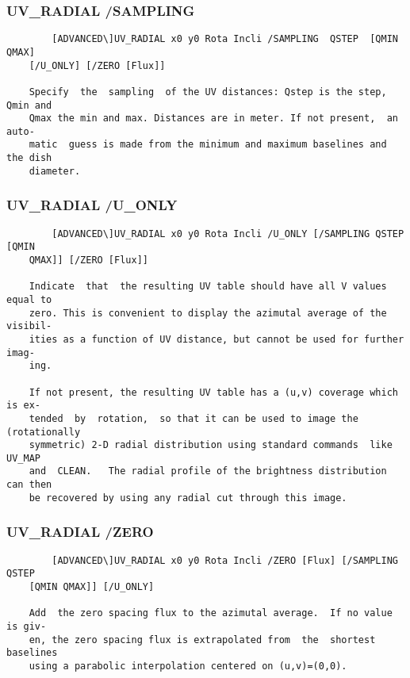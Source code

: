 \subsubsection{UV\_RADIAL /SAMPLING}
\begin{verbatim}
        [ADVANCED\]UV_RADIAL x0 y0 Rota Incli /SAMPLING  QSTEP  [QMIN  QMAX]
    [/U_ONLY] [/ZERO [Flux]]

    Specify  the  sampling  of the UV distances: Qstep is the step, Qmin and
    Qmax the min and max. Distances are in meter. If not present,  an  auto-
    matic  guess is made from the minimum and maximum baselines and the dish
    diameter.

\end{verbatim}
\subsubsection{UV\_RADIAL /U\_ONLY}
\begin{verbatim}
        [ADVANCED\]UV_RADIAL x0 y0 Rota Incli /U_ONLY [/SAMPLING QSTEP [QMIN
    QMAX]] [/ZERO [Flux]]

    Indicate  that  the resulting UV table should have all V values equal to
    zero. This is convenient to display the azimutal average of the visibil-
    ities as a function of UV distance, but cannot be used for further imag-
    ing.

    If not present, the resulting UV table has a (u,v) coverage which is ex-
    tended  by  rotation,  so that it can be used to image the (rotationally
    symmetric) 2-D radial distribution using standard commands  like  UV_MAP
    and  CLEAN.   The radial profile of the brightness distribution can then
    be recovered by using any radial cut through this image.

\end{verbatim}
\subsubsection{UV\_RADIAL /ZERO}
\begin{verbatim}
        [ADVANCED\]UV_RADIAL x0 y0 Rota Incli /ZERO [Flux] [/SAMPLING  QSTEP
    [QMIN QMAX]] [/U_ONLY]

    Add  the zero spacing flux to the azimutal average.  If no value is giv-
    en, the zero spacing flux is extrapolated from  the  shortest  baselines
    using a parabolic interpolation centered on (u,v)=(0,0).


\end{verbatim}
